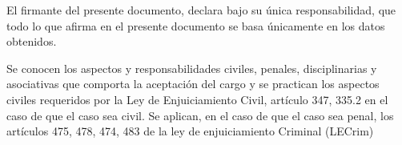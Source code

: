 El firmante del presente documento, declara bajo su única responsabilidad, que todo lo que afirma en el presente documento se basa únicamente en los datos obtenidos.\par

Se conocen los aspectos y responsabilidades civiles, penales, disciplinarias y asociativas que comporta la aceptación del cargo y se practican los aspectos civiles requeridos por la Ley de Enjuiciamiento Civil, artículo 347, 335.2 en el caso de que el caso sea civil.
Se aplican, en el caso de que el caso sea penal, los artículos 475, 478, 474, 483 de la ley de enjuiciamiento Criminal (LECrim)
